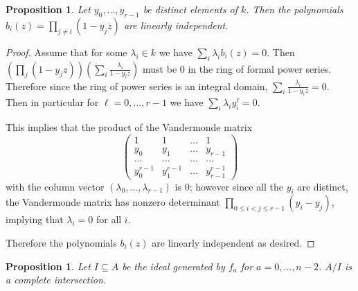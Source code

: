 \documentclass{article}
\numberwithin{equation}{section}
\newtheorem{proposition}[equation]{Proposition}
\begin{document}
\begin{proposition}\label{prop:vand}Let $y_0, \ldots, y_{r - 1}$ be distinct elements of $k$.  Then the polynomials $b_i(z) = \prod_{j \neq i} (1 - y_j z)$ are linearly independent.
\end{proposition}

\begin{proof} 

Assume that for some $\lambda_i \in k$ we have $\sum_i \lambda_ib_i(z)=0$.  Then $\left(\prod_j (1-y_jz)\right)\left(\sum_i \frac{\lambda_i}{1-y_iz}\right)$ must be $0$ in the ring of formal power series. Therefore since the ring of power series is an integral domain, $\sum_i \frac{\lambda_i}{1-y_iz}=0$. Then in particular for $\ell=0,\dots,r-1$ we have $\sum_i \lambda_iy_i^\ell=0$.

This implies that the product of the Vandermonde matrix $$\left(\begin{matrix} 1& 1& \dots& 1\\y_0&y_1&\dots&y_{r-1}\\\dots&\dots&\dots&\dots\\y_0^{r-1}&y_1^{r-1}&\dots&y_{r-1}^{r-1}\end{matrix}\right)$$ with the column vector $(\lambda_0,\dots,\lambda_{r-1})$ is $0$; however since all the $y_i$ are distinct, the Vandermonde matrix has nonzero determinant $\prod_{0 \le i < j \le r-1} (y_i-y_j)$, implying that $\lambda_i=0$ for all $i$. 

Therefore the polynomials $b_i(z)$ are linearly independent as desired.

\end{proof}


\begin{proposition}\label{prop:ci} Let $I \subseteq A$ be the ideal generated by $f_a$ for $a=0,\dots,n-2$. $A/I$ is a complete intersection. 
\end{proposition}
\end{document}
